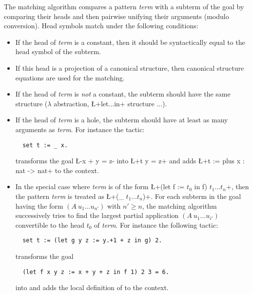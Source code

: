 The matching algorithm compares a pattern \textit{term}
 with a subterm of the goal by comparing their heads
and then pairwise unifying their arguments (modulo conversion). Head
symbols match under the following conditions:

\begin{itemize}
\item If the head of \textit{term} is a constant, then it
  should be syntactically equal to the head symbol of the subterm.
\item If this head is a projection of a canonical structure,
  then canonical structure equations are used for the matching.
\item If the head of \textit{term} is \emph{not} a constant, the
  subterm should have the same structure ($\lambda$ abstraction,
  \L+let$\dots$in+ structure ...).
\item If the head of \textit{term} is a hole, the subterm should have
  at least as many arguments as  \textit{term}. For instance the tactic:
\begin{lstlisting}
  set t := _ x.
\end{lstlisting}
transforms the goal \L-x + y = z- into \L+t y = z+ and adds
\L+t := plus x : nat -> nat+ to the context.

\item In the special case where \textit{term} is of the form 
\L+(let f := $t_0$ in f) $t_1\dots t_n$+,
 then the pattern \textit{term} is treated
as \L+(_ $t_1\dots t_n$)+. For each subterm in
the goal having the form $(A\  u_1\dots u_{n'})$ with $n' \geq n$, the
matching algorithm successively tries to find the largest
partial application $(A\ u_1\dots u_{i'})$ convertible to the head 
$t_0$ of \textit{term}. For instance the following tactic:
\begin{lstlisting}
  set t := (let g y z := y.+1 + z in g) 2.
\end{lstlisting}
transforms the goal
\begin{lstlisting}  
  (let f x y z := x + y + z in f 1) 2 3 = 6.
\end{lstlisting}
into  and adds the local definition of  to the
context.
\end{itemize}

